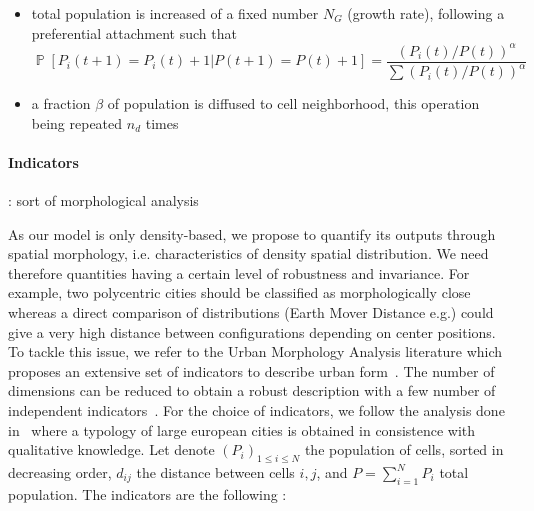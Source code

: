 \documentclass[10pt,letterpaper,draft]{article}
\DeclareMathOperator{\Proba}{\mathbb{P}}
\newcommand{\Pb}[1]{\ensuremath{\Proba\!\left[#1\right]}}
\begin{document}
\begin{itemize}
\item total population is increased of a fixed number $N_G$ (growth rate), following a preferential attachment such that 
\begin{equation}
\Pb{P_i(t+1)=P_i(t)+1|P(t+1)=P(t)+1}=\frac{(P_i(t)/P(t))^{\alpha}}{\sum(P_i(t)/P(t))^{\alpha}}
\end{equation}
\item a fraction $\beta$ of population is diffused to cell neighborhood, this operation being repeated $n_d$ times
\end{itemize}





\paragraph*{Indicators}


\cite{guerois2008built} : sort of morphological analysis




As our model is only density-based, we propose to quantify its outputs through spatial morphology, i.e. characteristics of density spatial distribution. We need therefore quantities having a certain level of robustness and invariance. For example, two polycentric cities should be classified as morphologically close whereas a direct comparison of distributions (Earth Mover Distance e.g.) could give a very high distance between configurations depending on center positions. To tackle this issue, we refer to the Urban Morphology Analysis literature which proposes an extensive set of indicators to describe urban form~\cite{tsai2005quantifying}. The number of dimensions can be reduced to obtain a robust description with a few number of independent indicators~\cite{Schwarz201029}. %
For the choice of indicators, we follow the analysis done in~\cite{le2015forme} where a typology of large european cities is obtained in consistence with qualitative knowledge. Let denote $(P_i)_{1\leq i \leq N}$ the population of cells, sorted in decreasing order, $d_{ij}$ the distance between cells $i,j$, and $P=\sum_{i=1}^{N} P_i$ total population. The indicators are the following :
\end{document}
